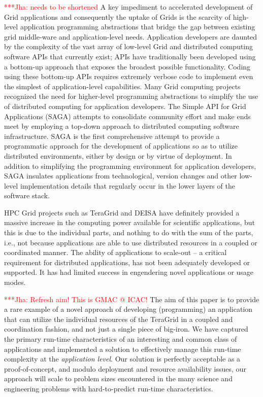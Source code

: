 \documentclass[conference,final]{IEEEtran}
\newcommand{\jhanote}[1]{ {\textcolor{red} { ***Jha: #1 }}}
\newcommand{\jhanote}[1]{}
\begin{document}
\jhanote{needs to be shortened} A key impediment to accelerated
development of Grid applications and consequently the uptake of Grids
is the scarcity of high-level application programming abstractions
that bridge the gap between existing grid middle-ware and
application-level needs.  Application developers are daunted by the
complexity of the vast array of low-level Grid and distributed
computing software APIs that currently exist; APIs have traditionally
been developed using a bottom-up approach that exposes the broadest
possible functionality.  Coding using these bottom-up APIs requires
extremely verbose code to implement even the simplest of
application-level capabilities.  Many Grid computing
projects~\cite{gat, cog, realitygrid} recognized the need for
higher-level programming abstractions to simplify the use of
distributed computing for application developers.  The Simple API for
Grid Applications (SAGA) attempts to consolidate community effort and
make ends meet by employing a top-down approach to distributed
computing software infrastructure.  SAGA is the first comprehensive
attempt to provide a programmatic approach for the development of
applications so as to utilize distributed environments, either by
design or by virtue of deployment.  In addition to simplifying the
programming environment for application developers, SAGA insulates
applications from technological, version changes and other low-level
implementation details that regularly occur in the lower layers of the
software stack.

HPC Grid projects such as TeraGrid and DEISA have definitely provided
a massive increase in the computing power available for scientific
applications, but this is due to the individual parts, and nothing to
do with the sum of the parts, i.e., not because applications are able
to use distributed resources in a coupled or coordinated manner. The
ability of applications to scale-out -- a critical requirement for
distributed applications, has not been adequately developed or
supported. It has had limited success in engendering novel
applications or usage modes.


\jhanote{Refresh aim! This is GMAC @ ICAC!}  The aim of this paper is
to provide a rare example of a novel approach of developing
(programming) an application that can utilize the individual resources
of the TeraGrid in a coupled and coordination fashion, and not just a
single piece of big-iron.  We have captured the primary run-time
characteristics of an interesting and common class of applications and
implemented a solution to effectively manage this run-time complexity
at the {\it application level}.  Our solution is perfectly acceptable
as a proof-of-concept, and modulo deployment and resource availability
issues, our approach will scale to problem sizes encountered in the
many science and engineering problems with hard-to-predict run-time
characteristics.
\end{document}
